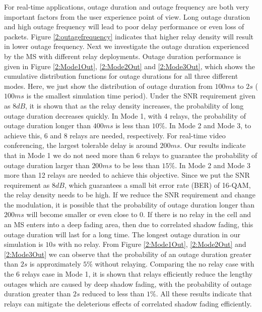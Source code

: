\par For real-time applications, outage duration and outage frequency are both very important factors from the user experience point of view. Long outage duration and high outage frequency will lead to poor delay performance or even loss of packets. Figure \ref{2:outagefrequency} indicates that higher relay density will result in lower outage frequency. Next we investigate the outage duration experienced by the MS with different relay deployments. Outage duration performance is given in Figure \ref{2:Mode1Out}, \ref{2:Mode2Out} and \ref{2:Mode3Out}, which shows the cumulative distribution functions for outage durations for all three different modes. Here, we just show the distribution of outage duration from $100ms$ to $2s$ ($100ms$ is the smallest simulation time period). Under the SNR requirement given as $8dB$, it is shown that as the relay density increases, the probability of long outage duration decreases quickly. In Mode 1, with 4 relays, the probability of outage duration longer than $400ms$ is less than $10\%$. In Mode 2 and Mode 3, to achieve this, 6 and 8 relays are needed, respectively. For real-time video conferencing, the largest tolerable delay is around $200ms$. Our results indicate that in Mode 1 we do not need more than 6 relays to guarantee the probability of outage duration larger than $200ms$ to be less than $15\%$. In Mode 2 and Mode 3 more than 12 relays are needed to achieve this objective. Since we put the SNR requirement as $8dB$, which guarantees a small bit error rate (BER) of 16-QAM, the relay density needs to be high. If we reduce the SNR requirement and change the modulation, it is possible that the probability of outage duration longer than $200ms$ will become smaller or even close to 0. If there is no relay in the cell and an MS enters into a deep fading area, then due to correlated shadow fading, this outage duration will last for a long time. The longest outage duration in our simulation is $10s$ with no relay. From Figure \ref{2:Mode1Out}, \ref{2:Mode2Out} and \ref{2:Mode3Out} we can observe that the probability of an outage duration greater than $2s$ is approximately $5\%$ without relaying. Comparing the no relay case with the 6 relays case in Mode 1, it is shown that relays efficiently reduce the lengthy outages which are caused by deep shadow fading, with the probability of outage duration greater than $2s$ reduced to less than $1\%$. All these results indicate that relays can mitigate the deleterious effects of correlated shadow fading efficiently.

